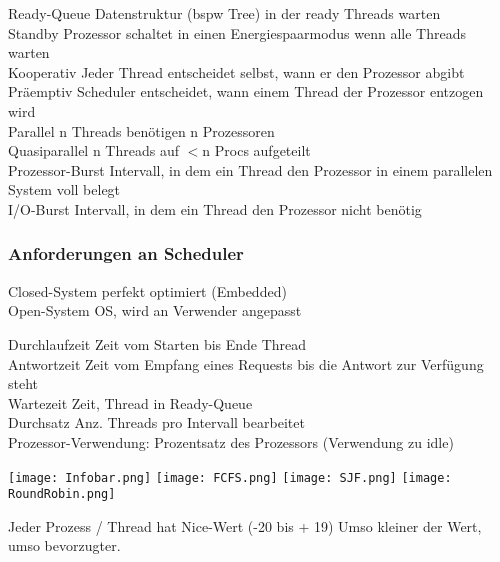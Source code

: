 \begin{multicols*}{5}
	\textcolor{h}{Ready-Queue} Datenstruktur (bspw Tree) in der ready Threads warten\\
	\textcolor{h}{Standby} Prozessor schaltet in einen Energiespaarmodus wenn alle Threads warten\\
	\textcolor{h}{Kooperativ} Jeder Thread entscheidet	selbst, wann er den Prozessor abgibt\\
	\textcolor{h}{Präemptiv} Scheduler entscheidet, wann einem Thread der Prozessor entzogen wird\\
	\textcolor{h}{Parallel} n Threads benötigen n Prozessoren\\
	\textcolor{h}{Quasiparallel} n Threads auf $<$n Procs aufgeteilt\\
	\textcolor{h}{Prozessor-Burst} Intervall, in dem ein Thread den Prozessor in einem parallelen System voll belegt\\
	\textcolor{h}{I/O-Burst} Intervall, in dem ein Thread den Prozessor nicht benötig\\

	\vspace{-4pt}
	\subsubsection{Anforderungen an Scheduler}
	\textcolor{h}{Closed-System} perfekt optimiert (Embedded)\\
	\textcolor{h}{Open-System} OS, wird an Verwender angepasst

	\vspace{-2pt}
	\drule{\linewidth}{1pt}
	\textcolor{h}{Durchlaufzeit} Zeit vom Starten bis Ende Thread\\
	\textcolor{h}{Antwortzeit} Zeit vom Empfang eines Requests bis die Antwort zur Verfügung steht\\
	\textcolor{h}{Wartezeit} Zeit, Thread in Ready-Queue\\
	\textcolor{h}{Durchsatz} Anz. Threads pro Intervall bearbeitet\\
	\textcolor{h}{Prozessor-Verwendung:} Prozentsatz des Prozessors (Verwendung zu idle)\\

	\vspace{-23pt}
	\begin{center}
		\texttt{[image: Infobar.png]}
		\texttt{[image: FCFS.png]}
		\texttt{[image: SJF.png]}
		\texttt{[image: RoundRobin.png]}
	\end{center}

	\vspace{-10pt}
	Jeder Prozess / Thread hat Nice-Wert (-20 bis + 19) Umso kleiner der Wert, umso bevorzugter.


\end{multicols*}

